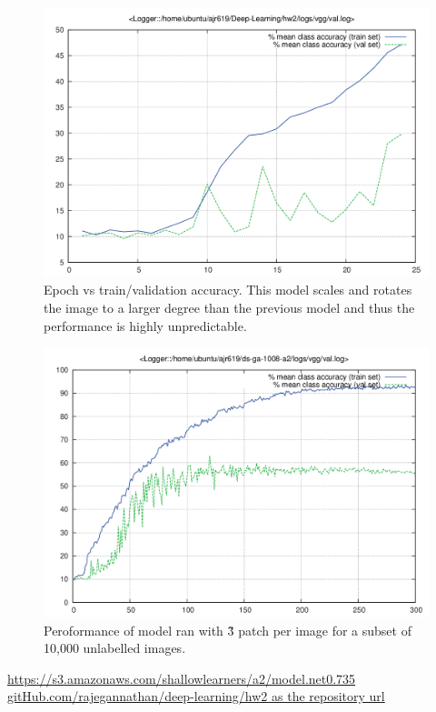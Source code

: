 \documentclass{article}
\begin{document}
\begin{figure}[ht!]
  \centering
  \includegraphics[width=\textwidth]{images/vgg/val}
  \caption{Epoch vs train/validation accuracy.  This model scales and rotates the image to a larger degree than the previous model and thus the performance is highly unpredictable.}
\end{figure}

\begin{figure}[ht!]
  \centering
  \includegraphics[width=\textwidth]{images/vggInDS-ga/val}
  \caption{Peroformance of model ran with \~3 patch per image for a subset of 10,000 unlabelled images.}
\end{figure}

\begin{thebibliography}{9}
 \url{https://s3.amazonaws.com/shallowlearners/a2/model.net0.735}
\url{gitHub.com/rajegannathan/deep-learning/hw2 as the repository url}
\end{thebibliography}
\end{document}
